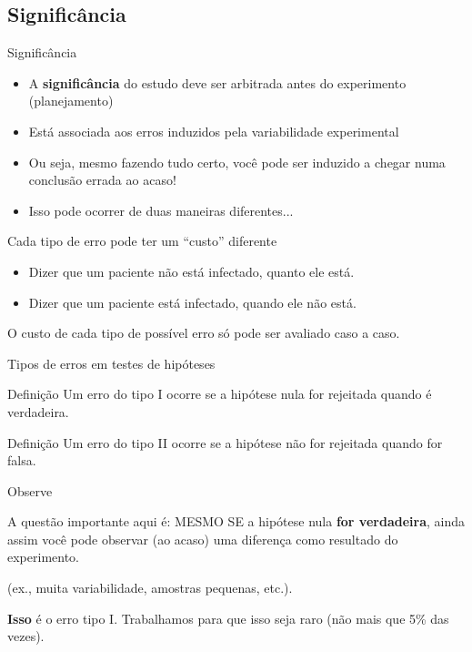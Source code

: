 \documentclass{beamer}
\begin{document}
\subsection{Significância}
\begin{frame}{\scriptsize Significância}
  \begin{itemize}
    \footnotesize
  \item A {\bf significância} do estudo deve ser arbitrada antes do experimento (planejamento)
  \item Está associada aos erros induzidos pela variabilidade experimental
  \item Ou seja, mesmo fazendo tudo certo, você pode ser induzido a chegar numa conclusão errada ao acaso!
  \item Isso pode ocorrer de duas maneiras diferentes...
  \end{itemize}
\end{frame}

\begin{frame}{\scriptsize Cada tipo de erro pode ter um ``custo'' diferente}
  \begin{itemize}
    \footnotesize
  \item Dizer que um paciente não está infectado, quanto ele está.
  \item Dizer que um paciente está infectado, quando ele não está.
  \end{itemize}

  \bigskip
  \begin{block}{}
    \footnotesize
    O custo de cada tipo de possível erro só pode ser avaliado caso a caso.
  \end{block}
\end{frame}

\begin{frame}{\scriptsize Tipos de erros em testes de hipóteses}
  \begin{block}{Definição}
    \footnotesize
    Um \alert{erro do tipo I} ocorre se a hipótese nula for rejeitada
    quando é verdadeira.
  \end{block}
  \begin{block}{Definição}
    \footnotesize
    Um \alert{erro do tipo II} ocorre se a hipótese não for rejeitada
    quando for falsa.
  \end{block}
\end{frame}

\begin{frame}[label=observacao]{\scriptsize Observe}
  \begin{block}{A questão importante aqui é:}
    \footnotesize
    MESMO SE a hipótese nula {\bf for verdadeira}, ainda assim você pode observar (ao acaso) uma diferença como resultado do experimento.

    \bigskip
    (ex., muita variabilidade, amostras pequenas, etc.).

    \bigskip
    {\bf Isso} é o erro tipo I. Trabalhamos para que isso seja raro (não mais que 5\% das vezes).
  \end{block}
\end{frame}
\end{document}
